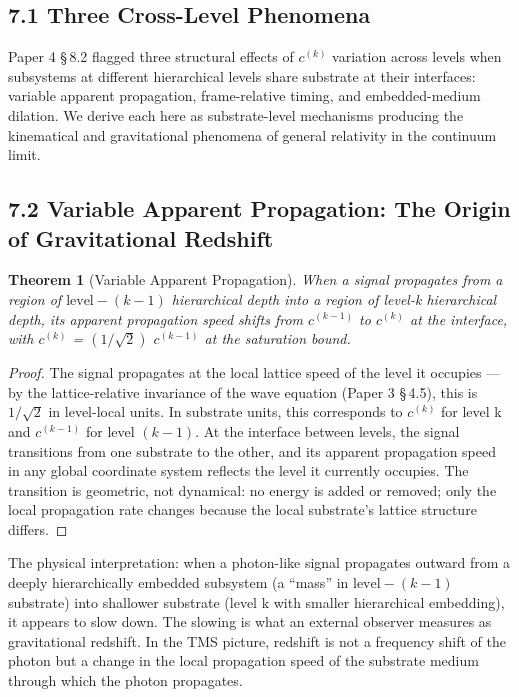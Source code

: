\documentclass[11pt,oneside]{report}
\newtheorem{theorem}{Theorem}[section]
\theoremstyle{definition}
\theoremstyle{remark}
\begin{document}
\subsection*{7.1 Three Cross-Level Phenomena}

Paper 4 \S\,8.2 flagged three structural effects of \ensuremath{c^{(k)}} variation
across levels when subsystems at different hierarchical levels share
substrate at their interfaces: variable apparent propagation,
frame-relative timing, and embedded-medium dilation. We derive each here
as substrate-level mechanisms producing the kinematical and
gravitational phenomena of general relativity in the continuum limit.

\subsection*{7.2 Variable Apparent Propagation: The Origin of Gravitational Redshift}

\begin{theorem}[Variable Apparent Propagation]
When a signal
propagates from a region of \ensuremath{\text{level}-(k-1)} hierarchical depth into a region
of level-k hierarchical depth, its apparent propagation speed shifts
from \ensuremath{c^{(k-1)}} to \ensuremath{c^{(k)}} at the interface, with \ensuremath{c^{(k)}} = \ensuremath{(1/\sqrt{2})}
\ensuremath{c^{(k-1)}} at the saturation bound.
\end{theorem}

\begin{proof}
The signal propagates at the local lattice speed of the
level it occupies --- by the lattice-relative invariance of the wave
equation (Paper 3 \S\,4.5), this is \ensuremath{1/\sqrt{2}} in level-local units. In substrate
units, this corresponds to \ensuremath{c^{(k)}} for level k and \ensuremath{c^{(k-1)}} for level
\ensuremath{(k-1).} At the interface between levels, the signal transitions from one
substrate to the other, and its apparent propagation speed in any global
coordinate system reflects the level it currently occupies. The
transition is geometric, not dynamical: no energy is added or removed;
only the local propagation rate changes because the local substrate's
lattice structure differs.

\end{proof}

The physical interpretation: when a photon-like signal propagates
outward from a deeply hierarchically embedded subsystem (a ``mass'' in
\ensuremath{\text{level}-(k-1)} substrate) into shallower substrate (level k with smaller
hierarchical embedding), it appears to slow down. The slowing is what an
external observer measures as gravitational redshift. In the TMS
picture, redshift is not a frequency shift of the photon but a change in
the local propagation speed of the substrate medium through which the
photon propagates.
\end{document}
